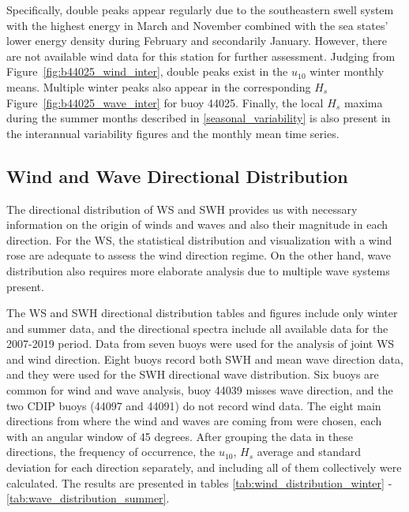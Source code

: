 Specifically, double peaks appear regularly due to the southeastern swell system with the highest energy in March and November combined with the sea states' lower energy density during February and secondarily January.   
However, there are not available wind data for this station for further assessment. Judging from Figure~\ref{fig:b44025_wind_inter}, double peaks exist in the $u_{10}$ winter monthly means. Multiple winter peaks also appear in the corresponding $H_{s}$ Figure~\ref{fig:b44025_wave_inter} for buoy 44025. Finally, the local $H_{s}$ maxima during the summer months described in \ref{seasonal_variability} is also present in the interannual variability figures and the monthly mean time series.




\subsection{Wind and Wave Directional Distribution}

The directional distribution of WS and SWH provides us with necessary information on the origin of winds and waves and also their magnitude in each direction. For the WS, the statistical distribution and visualization with a wind rose are adequate to assess the wind direction regime. On the other hand, wave distribution also requires more elaborate analysis due to multiple wave systems present. 

The WS and SWH directional distribution tables and figures include only winter and summer data, and the directional spectra include all available data for the 2007-2019 period. Data from seven buoys were used for the analysis of joint WS and wind direction. Eight buoys record both SWH and mean wave direction data, and they were used for the SWH directional wave distribution. Six buoys are common for wind and wave analysis, buoy 44039 misses wave direction, and the two CDIP buoys (44097 and 44091) do not record wind data. The eight main directions from where the wind and waves are coming from were chosen, each with an angular window of 45 degrees. After grouping the data in these directions, the frequency of occurrence, the $u_{10}$, $H_{s}$ average and standard deviation for each direction separately, and including all of them collectively were calculated. The results are presented in tables \ref{tab:wind_distribution_winter} - \ref{tab:wave_distribution_summer}.

